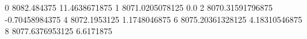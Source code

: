 0 8082.484375 11.4638671875
1 8071.0205078125 0.0
2 8070.31591796875 -0.70458984375
4 8072.1953125 1.1748046875
6 8075.20361328125 4.18310546875
8 8077.6376953125 6.6171875
